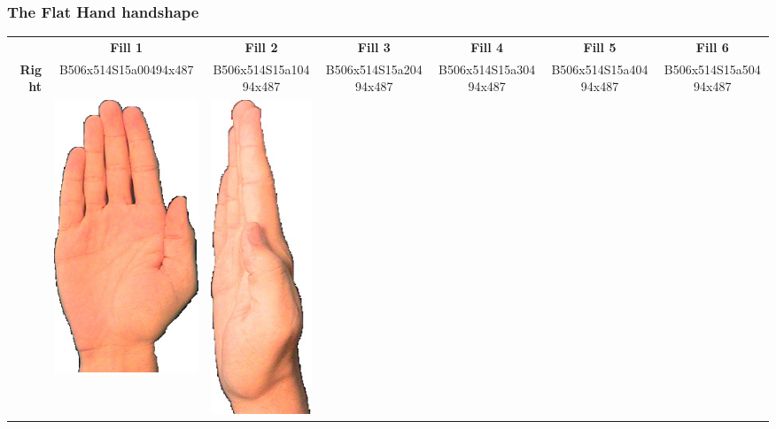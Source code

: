 \documentclass{article}
\begin{document}
\subsubsection{The Flat Hand handshape}

\begin{center}
\begin{tabular}{r*{6}{c}}
&\textbf{Fill 1}&\textbf{Fill 2}&\textbf{Fill 3}&\textbf{Fill 4}&\textbf{Fill 5}&\textbf{Fill 6}\\
\multirow{2}{*}{\textbf{Right}}&
B506x514S15a00494x487&
B506x514S15a10494x487&
B506x514S15a20494x487&
B506x514S15a30494x487&
B506x514S15a40494x487&
B506x514S15a50494x487\\
&
\includegraphics[scale=0.1]{images/05-10-1.jpg}&
\includegraphics[scale=0.1]{images/05-10-2.jpg}&

\end{tabular}
\end{center}
\end{document}
